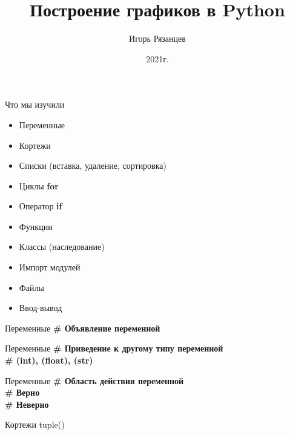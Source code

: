 \documentclass[12pt]{beamer}
\author{Игорь Рязанцев}
\title{Построение графиков в Python}
\institute{Лекция 04}
\date{2021г.}
\begin{document}
\begin{frame}
\titlepage
\end{frame}

\begin{frame}{Что мы изучили}
\begin{itemize}
\item Переменные 
\item Кортежи
\item Списки (вставка, удаление, сортировка)
\item Циклы \textbf{for}
\item Оператор \textbf{if}
\item Функции
\item Классы (наследование)
\item Импорт модулей
\item Файлы
\item Ввод-вывод 
\end{itemize}
\end{frame}


\begin{frame}{Переменные}
\textbf{\# Объявление переменной} \\
\vspace{0.5cm}

\end{frame}

\begin{frame}{Переменные}
\textbf{\# Приведение к другому типу переменной} \\
\textbf{\# (int), (float), (str) } \\
\vspace{0.0cm}

\end{frame}

\begin{frame}{Переменные}
\textbf{\# Область действия переменной} \\
\vspace{0.4cm}
\textbf{\# Верно} \\

\vspace{0.4cm}
\textbf{\# Неверно} \\

\end{frame}


\begin{frame}{Кортежи tuple()}

\end{frame}
\end{document}
